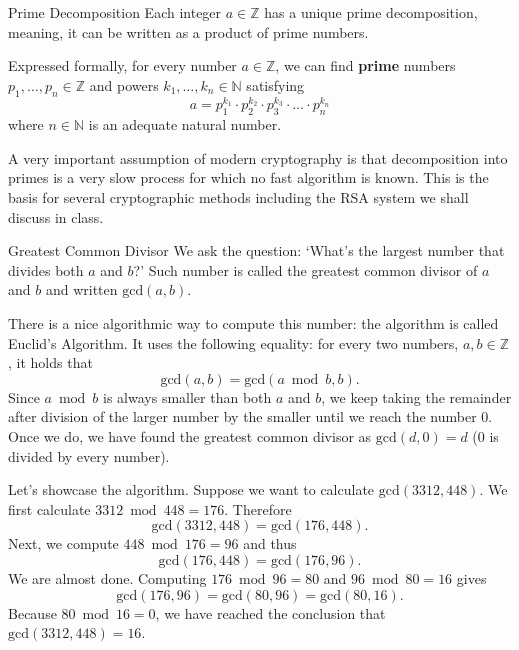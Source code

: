 \documentclass[final]{beamer}
\newlength{\colwidth}
\newcommand{\N}{\mathbb{N}}
\newcommand{\Z}{\mathbb{Z}}
\begin{document}
\begin{frame}[t]
\begin{columns}[t]
\begin{column}{\colwidth}
\begin{block}{Prime Decomposition}
 Each integer $a \in \Z$ has a \alert{unique prime decomposition}, meaning, it
 can be written as a \alert{product of prime numbers}.

 Expressed formally, for every number $a \in \Z$, we can find \textbf{prime}
 numbers $p_1,\ldots,p_n \in \Z$ and powers $k_1,\ldots,k_n \in \N$ satisfying
 \[
  a = p_1^{k_1} \cdot p_2^{k_2} \cdot p_3^{k_3} \cdot \ldots \cdot p_n^{k_n}
 \]
 where $n \in \N$ is an adequate natural number.

 A very important assumption of modern cryptography is that decomposition into
 primes is a very slow process for which no fast algorithm is known. This is the
 basis for several cryptographic methods including the RSA system we shall
 discuss in class.
\end{block}

\begin{exampleblock}{Greatest Common Divisor}
 We ask the question: `What's the \alert{largest number that divides} both $a$
 and $b$?' Such number is called the \alert{greatest common divisor} of $a$ and
 $b$ and written $\mathrm{gcd}(a,b)$.

 There is a nice \alert{algorithmic way} to compute this number: the algorithm
 is called \alert{Euclid's Algorithm}. It uses the following equality: for every
 two numbers, $a,b \in \Z$, it holds that
 \[
  \mathrm{gcd}(a,b) = \mathrm{gcd}(a \bmod b, b).
 \]
 Since $a \bmod b$ is always smaller than both $a$ and $b$, we keep taking the
 remainder after division of the larger number by the smaller until we reach the
 number $0$. Once we do, we have found the greatest common divisor as
 $\mathrm{gcd}(d,0) = d$ ($0$ is divided by every number).

 Let's showcase the algorithm. Suppose we want to calculate $\mathrm{gcd}(3312,
 448)$. We first calculate $3312 \bmod 448 = 176$. Therefore
 \[
  \mathrm{gcd}(3312, 448) = \mathrm{gcd}(176, 448).
 \]
 Next, we compute $448 \bmod 176 = 96$ and thus
 \[
  \mathrm{gcd}(176, 448) = \mathrm{gcd}(176, 96).
 \]
 We are almost done. Computing $176 \bmod 96 = 80$ and $96 \bmod 80 = 16$ gives
 \[
  \mathrm{gcd}(176, 96) = \mathrm{gcd}(80, 96) = \mathrm{gcd}(80, 16).
 \]
 Because $80 \bmod 16 = 0$, we have reached the conclusion that
 $\mathrm{gcd}(3312, 448) = 16$.
\end{exampleblock}


\end{column}
\end{columns}
\end{frame}
\end{document}
